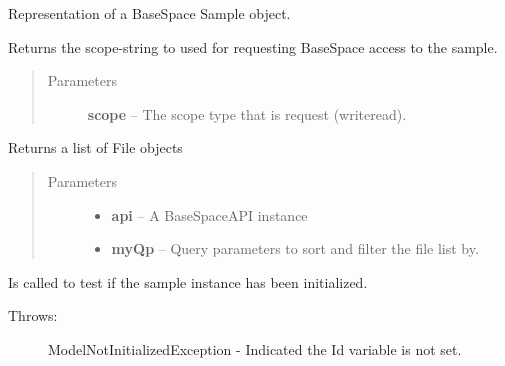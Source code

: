 \documentclass[letterpaper,10pt,english]{sphinxmanual}
\begin{document}
\begin{fulllineitems}
\label{Available modules:BaseSpacePy.model.Sample.Sample}
Representation of a BaseSpace Sample object.

\begin{fulllineitems}
\label{Available modules:BaseSpacePy.model.Sample.Sample.getAccessStr}
Returns the scope-string to used for requesting BaseSpace access to the sample.
\begin{quote}\begin{description}
\item[{Parameters}] \leavevmode
\textbf{scope} -- The scope type that is request (write\textbar{}read).

\end{description}\end{quote}

\end{fulllineitems}


\begin{fulllineitems}
\label{Available modules:BaseSpacePy.model.Sample.Sample.getFiles}
Returns a list of File objects
\begin{quote}\begin{description}
\item[{Parameters}] \leavevmode\begin{itemize}
\item {} 
\textbf{api} -- A BaseSpaceAPI instance

\item {} 
\textbf{myQp} -- Query parameters to sort and filter the file list by.

\end{itemize}

\end{description}\end{quote}

\end{fulllineitems}


\begin{fulllineitems}
\label{Available modules:BaseSpacePy.model.Sample.Sample.isInit}
Is called to test if the sample instance has been initialized.
\begin{description}
\item[{Throws:}] \leavevmode
ModelNotInitializedException - Indicated the Id variable is not set.

\end{description}

\end{fulllineitems}


\end{fulllineitems}
\end{document}
